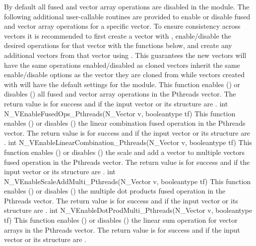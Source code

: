 By default all fused and vector array operations are disabled in the {\nvecpthreads}
module. The following additional user-callable routines are provided to
enable or disable fused and vector array operations for a specific vector. To
ensure consistency across vectors it is recommended to first create a vector
with , enable/disable the desired operations for that vector
with the functions below, and create any additional vectors from that vector
using . This guarantees the new vectors will have the same
operations enabled/disabled as cloned vectors inherit the same enable/disable
options as the vector they are cloned from while vectors created with
 will have the default settings for the {\nvecpthreads} module.
{
  This function enables () or disables () all fused and
  vector array operations in the Pthreads vector. The return value is  for
  success and  if the input vector or its  structure are .
}
{
  int N\_VEnableFusedOps\_Pthreads(N\_Vector v, booleantype tf)
}
{
  This function enables () or disables () the linear
  combination fused operation in the Pthreads vector. The return value is  for
  success and  if the input vector or its  structure are .
}
{
  int N\_VEnableLinearCombination\_Pthreads(N\_Vector v, booleantype tf)
}
{
  This function enables () or disables () the scale and
  add a vector to multiple vectors fused operation in the Pthreads vector. The
  return value is  for success and  if the input vector or its
   structure are .
}
{
  int N\_VEnableScaleAddMulti\_Pthreads(N\_Vector v, booleantype tf)
}
{
  This function enables () or disables () the multiple
  dot products fused operation in the Pthreads vector. The return value is 
  for success and  if the input vector or its  structure are
  .
}
{
  int N\_VEnableDotProdMulti\_Pthreads(N\_Vector v, booleantype tf)
}
{
  This function enables () or disables () the linear sum
  operation for vector arrays in the Pthreads vector. The return value is  for
  success and  if the input vector or its  structure are .
}
